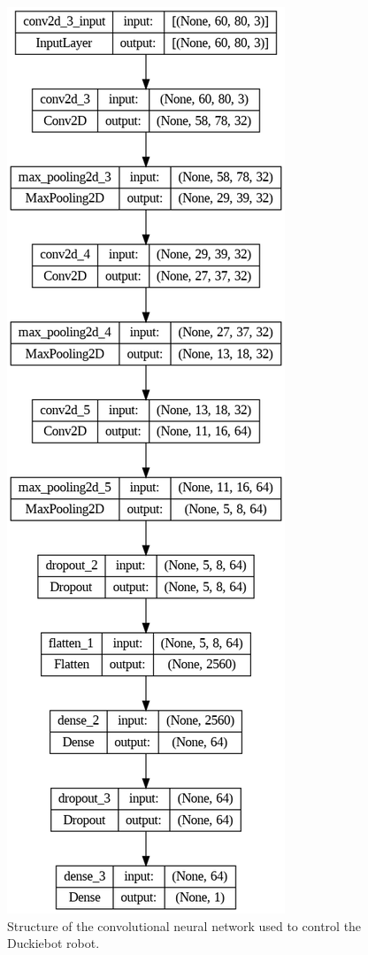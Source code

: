 \documentclass[conference]{IEEEtran}
\begin{document}
\begin{figure}[h]
    \centering
    \includegraphics[width=.5\columnwidth]{cnn2}
    \caption{Structure of the convolutional neural network used to control the Duckiebot robot.}
    \label{fig:cnn-structure}
\end{figure}
\end{document}
